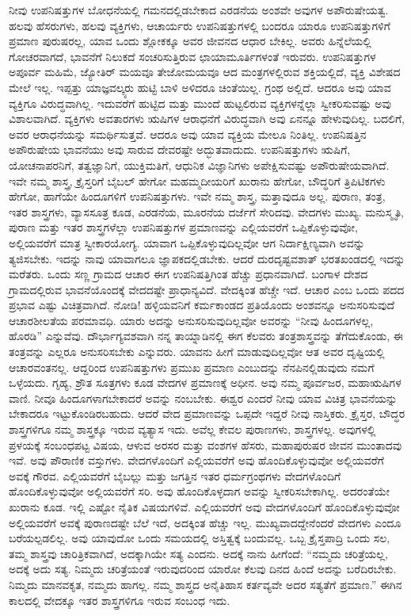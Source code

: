 ನೀವು ಉಪನಿಷತ್ತುಗಳ ಬೋಧನೆಯಲ್ಲಿ ಗಮನದಲ್ಲಿಡಬೇಕಾದ ಎರಡನೆಯ ಅಂಶವೇ ಅವುಗಳ ಅಪೌರುಷೇಯತ್ವ. ಹಲವು ಹೆಸರುಗಳು, ಹಲವು ವ್ಯಕ್ತಿಗಳು, ಆಚಾರ್ಯರು ಉಪನಿಷತ್ತುಗಳಲ್ಲಿ ಬಂದರೂ ಯಾರೂ ಉಪನಿಷತ್ತುಗಳಿಗೆ ಪ್ರಮಾಣ ಪುರುಷರಲ್ಲ, ಯಾವ ಒಂದು ಶ್ಲೋಕಕ್ಕೂ ಅವರ ಜೀವನದ ಆಧಾರ ಬೇಕಿಲ್ಲ. ಅವರು ಹಿನ್ನೆಲೆಯಲ್ಲಿ ಗೋಚರವಾಗದೆ, ಭಾವನೆಗೆ ನಿಲುಕದೆ ಸಂಚರಿಸುತ್ತಿರುವ ಛಾಯಾಮೂರ್ತಿಗಳಂತೆ ಇರುವರು. ಉಪನಿಷತ್ತುಗಳ ಅಪೂರ್ವ ಮಹಿಮೆ, ಜ್ಯೋತಿರ್ ಮಯವೂ ತೇಜೋಮಯವೂ ಆದ ಮಂತ್ರಗಳಲ್ಲಿರುವ ಶಕ್ತಿಯಲ್ಲಿದೆ, ವ್ಯಕ್ತಿ ವಿಶೇಷದ ಮೇಲೆ ಇಲ್ಲ. ಇಪ್ಪತ್ತು ಯಾಜ್ಞವಲ್ಕ್ಯರು ಹುಟ್ಟಿ ಬಾಳಿ ಅಳಿದರೂ ಚಿಂತೆಯಿಲ್ಲ. ಗ್ರಂಥ ಅಲ್ಲಿದೆ. ಆದರೂ ಅವು ಯಾವ ವ್ಯಕ್ತಿಗೂ ವಿರುದ್ಧವಾಗಿಲ್ಲ. ಇದುವರೆಗೆ ಹುಟ್ಟಿದ ಮತ್ತು ಮುಂದೆ ಹುಟ್ಟಲಿರುವ ವ್ಯಕ್ತಿಗಳನ್ನೆಲ್ಲಾ ಸ್ವೀಕರಿಸುವಷ್ಟು ಅವು ವಿಶಾಲವಾಗಿದೆ. ವ್ಯಕ್ತಿಗಳು ಅವತಾರಗಳು ಋಷಿಗಳ ಆರಾಧನೆಗೆ ವಿರುದ್ಧವಾಗಿ ಅವು ಏನನ್ನೂ ಹೇಳುವುದಿಲ್ಲ. ಬದಲಿಗೆ, ಅವರ ಆರಾಧನೆಯನ್ನು ಸಮರ್ಥಿಸುತ್ತವೆ. ಆದರೂ ಅವು ಯಾವ ವ್ಯಕ್ತಿಯ ಮೇಲೂ ನಿಂತಿಲ್ಲ. ಉಪನಿಷತ್ತಿನ ಅಪೌರುಷೇಯ ಭಾವನೆಯು ಅವು ಸಾರುವ ದೇವರಷ್ಟೇ ಅದ್ಭುತವಾದುದು. ಉಪನಿಷತ್ತುಗಳು ಋಷಿಗೆ, ಯೋಚನಾಪರನಿಗೆ, ತತ್ವಜ್ಞಾನಿಗೆ, ಯುಕ್ತಿಮತಿಗೆ, ಆಧುನಿಕ ವಿಜ್ಞಾನಿಗಳು ಅಪೇಕ್ಷಿಸುವಷ್ಟು ಅಪೌರುಷೇಯವಾಗಿದೆ. ಇವೇ ನಮ್ಮ ಶಾಸ್ತ್ರ, ಕ್ರೈಸ್ತರಿಗೆ ಬೈಬಲ್​ ಹೇಗೋ ಮಹಮ್ಮದೀಯರಿಗೆ ಖುರಾನು ಹೇಗೋ, ಬೌದ್ಧರಿಗೆ ತ್ರಿಪಿಟಿಕಗಳು ಹೇಗೋ, ಹಾಗೆಯೇ ಹಿಂದೂಗಳಿಗೆ ಉಪನಿಷತ್ತುಗಳು. ಇವೇ ನಮ್ಮ ಶಾಸ್ತ್ರ, ಮತ್ತಾವುದೂ ಅಲ್ಲ. ಪುರಾಣ, ತಂತ್ರ, ಇತರ ಶಾಸ್ತ್ರಗಳು, ವ್ಯಾಸಸೂತ್ರ ಕೂಡ, ಎರಡನೆಯ, ಮೂರನೆಯ ದರ್ಜೆಗೆ ಸೇರಿದವು. ವೇದಗಳು ಮುಖ್ಯ. ಮನುಸ್ಮೃತಿ, ಪುರಾಣ ಮತ್ತು ಇತರ ಶಾಸ್ತ್ರಗಳೆಲ್ಲಾ ಉಪನಿಷತ್ತುಗಳ ಪ್ರಮಾಣವನ್ನು ಎಲ್ಲಿಯವರೆಗೆ ಒಪ್ಪಿಕೊಳ್ಳುವುವೋ, ಅಲ್ಲಿಯವರೆಗೆ ಮಾತ್ರ ಸ್ವೀಕಾರಯೋಗ್ಯ. ಯಾವಾಗ ಒಪ್ಪಿಕೊಳ್ಳುವುದಿಲ್ಲವೋ ಆಗ ನಿರ್ದಾಕ್ಷಿಣ್ಯವಾಗಿ ಅವನ್ನು ತ್ಯಜಿಸಬೇಕು. ಇದನ್ನು ನಾವು ಯಾವಾಗಲೂ ಜ್ಞಾಪಕದಲ್ಲಿಡಬೇಕು. ಆದರೆ ದುರದೃಷ್ಟವಶಾತ್​ ಭರತಖಂಡದಲ್ಲಿ ಇದನ್ನು ಮರೆತರು. ಒಂದು ಸಣ್ಣ ಗ್ರಾಮದ ಆಚಾರ ಈಗ ಉಪನಿಷತ್ತಿಗಿಂತ ಹೆಚ್ಚು ಪ್ರಧಾನವಾಗಿದೆ. ಬಂಗಾಳ ದೇಶದ ಗ್ರಾಮದಲ್ಲಿರುವ ಭಾವನೆಯೊಂದಕ್ಕೆ ವೇದದಷ್ಟೇ ಪ್ರಾಧಾನ್ಯವಿದೆ. ವೇದಕ್ಕಿಂತ ಹೆಚ್ಚೇ ಇದೆ. ಆಚಾರ ಎಂಬ ಒಂದು ಪದದ ಪ್ರಭಾವ ಎಷ್ಟು ವಿಚಿತ್ರವಾಗಿದೆ. ನೋಡಿ! ಹಳ್ಳಿಯವನಿಗೆ ಕರ್ಮಕಾಂಡದ ಪ್ರತಿಯೊಂದು ಅಂಶವನ್ನೂ ಅನುಸರಿಸುವುದೆ ಆಚಾರಶೀಲತೆಯ ಪರಮಾವಧಿ. ಯಾರು ಅದನ್ನು ಅನುಸರಿಸುವುದಿಲ್ಲವೋ ಅವರನ್ನು “ನೀವು ಹಿಂದೂಗಳಲ್ಲ, ಹೊರಡಿ” ಎನ್ನುವೆವು. ದೌರ್ಭಾಗ್ಯವಶವಾಗಿ ನನ್ನ ತಾಯ್ನಾಡಿನಲ್ಲಿ ಈಗ ಕೆಲವರು ತಂತ್ರಶಾಸ್ತ್ರವನ್ನು ತೆಗೆದುಕೊಂಡು, ಈ ತಂತ್ರವನ್ನು ಎಲ್ಲರೂ ಅನುಸರಿಸಬೇಕು ಎನ್ನುವರು. ಯಾವನು ಹೀಗೆ ಮಾಡುವುದಿಲ್ಲವೋ ಆತ ಅವರ ದೃಷ್ಟಿಯಲ್ಲಿ ಆಚಾರವಂತನಲ್ಲ. ಆದ್ದರಿಂದ ಉಪನಿಷತ್ತುಗಳು ಪ್ರಮುಖ ಪ್ರಮಾಣ ಎಂಬುದನ್ನು ನೆನಪಿನಲ್ಲಿಡುವುದು ನಮಗೆ ಒಳ್ಳೆಯದು. ಗೃಹ್ಯ, ಶ್ರೌತ ಸೂತ್ರಗಳು ಕೂಡ ವೇದಗಳ ಪ್ರಮಾಣಕ್ಕೆ ಅಧೀನ. ಅವು ನಮ್ಮ ಪೂರ್ವಜರ, ಮಹಾಋಷಿಗಳ ವಾಣಿ. ನೀವೂ ಹಿಂದೂಗಳಾಗಬೇಕಾದರೆ ಅವನ್ನು ನಂಬಬೇಕು. ಈಶ್ವರ ಎಂದರೆ ನೀವು ಯಾವ ವಿಚಿತ್ರ ಭಾವನೆಯನ್ನು ಬೇಕಾದರೂ ಇಟ್ಟುಕೊಂಡಿರಬಹುದು. ಆದರೆ ವೇದ ಪ್ರಮಾಣವನ್ನು ಒಪ್ಪದೇ ಇದ್ದರೆ ನೀವು ನಾಸ್ತಿಕರು. ಕ್ರೈಸ್ತರ, ಬೌದ್ಧರ ಶಾಸ್ತ್ರಗಳಿಗೂ ನಮ್ಮ ಶಾಸ್ತ್ರಕ್ಕೂ ಇರುವ ವ್ಯತ್ಯಾಸ ಇದು. ಅವೆಲ್ಲ ಕೇವಲ ಪುರಾಣಗಳು, ಶಾಸ್ತ್ರಗಳಲ್ಲ. ಅವುಗಳಲ್ಲಿ ಪ್ರಳಯಕ್ಕೆ ಸಂಬಂಧಪಟ್ಟ ವಿಷಯ, ಆಳುವ ಅರಸರ ಮತ್ತು ವಂಶಗಳ ಹೆಸರು, ಮಹಾಪುರುಷರ ಜೀವನ ಮುಂತಾದವು ಇವೆ. ಅವು ಪೌರಾಣಿಕ ವಸ್ತುಗಳು. ವೇದಗಳೊಂದಿಗೆ ಎಲ್ಲಿಯವರೆಗೆ ಅವು ಹೊಂದಿಕೊಳ್ಳುವುವೋ ಅಲ್ಲಿಯವರೆಗೆ ಅವಕ್ಕೆ ಗೌರವ. ಎಲ್ಲಿಯವರೆಗೆ ಬೈಬಲ್ಲು ಮತ್ತು ಜಗತ್ತಿನ ಇತರ ಧರ್ಮಗ್ರಂಥಗಳು ವೇದಗಳೊಂದಿಗೆ ಹೊಂದಿಕೊಳ್ಳುವುವೋ ಅಲ್ಲಿಯವರೆಗೆ ಸರಿ. ಅವು ಹೊಂದಿಕೊಳ್ಳದಾಗ ಅವನ್ನು ಸ್ವೀಕರಿಸಬೇಕಾಗಿಲ್ಲ. ಅದರಂತೆಯೇ ಖುರಾನು ಕೂಡ. ಇಲ್ಲಿ ಎಷ್ಟೋ ನೈತಿಕ ವಿಷಯಗಳಿವೆ. ಎಲ್ಲಿಯವರೆಗೆ ಅವು ವೇದಗಳೊಂದಿಗೆ ಹೊಂದಿಕೊಳ್ಳುವುವೋ ಅಲ್ಲಿಯವರೆಗೆ ಅವಕ್ಕೆ ಪುರಾಣದಷ್ಟೇ ಬೆಲೆ ಇದೆ, ಅದಕ್ಕಿಂತ ಹೆಚ್ಚು ಇಲ್ಲ. ಮುಖ್ಯವಾದದ್ದೇನೆಂದರೆ ವೇದಗಳು ಎಂದೂ ಬರೆಯಲ್ಪಡಲಿಲ್ಲ. ಅವು ಯಾವುದೋ ಒಂದು ಸಮಯದಲ್ಲಿ ಅಸ್ತಿತ್ವಕ್ಕೆ ಬಂದುವಲ್ಲ. ಒಬ್ಬ ಕ್ರೈಸ್ತಪಾದ್ರಿ ಒಂದು ಸಲ, ತಮ್ಮ ಶಾಸ್ತ್ರವು ಚಾರಿತ್ರಿಕವಾಗಿದೆ, ಅದಕ್ಕಾಗಿಯೇ ಸತ್ಯ ಎಂದನು. ಅದಕ್ಕೆ ನಾನು ಹೀಗೆಂದೆ: “ನಮ್ಮದು ಚರಿತ್ರೆಯಲ್ಲ, ಅದಕ್ಕೆ ಅದು ಸತ್ಯ. ನಿಮ್ಮದು ಚರಿತ್ರೆಯಂತೆ ಇರುವುದರಿಂದ ಯಾರೋ ಕೆಲವು ದಿನದ ಹಿಂದೆ ಅದನ್ನು ಬರೆದಿರಬೇಕು. ನಿಮ್ಮದು ಮಾನವಕೃತ, ನಮ್ಮದು ಹಾಗಲ್ಲ. ನಮ್ಮ ಶಾಸ್ತ್ರದ ಅನೈತಿಹಾಸ ಕರ್ತವ್ಯವೇ ಅದರ ಸತ್ಯತೆಗೆ ಪ್ರಮಾಣ.” ಈಗಿನ ಕಾಲದಲ್ಲಿ ವೇದಕ್ಕೂ ಇತರ ಶಾಸ್ತ್ರಗಳಿಗೂ ಇರುವ ಸಂಬಂಧ ಇದು.

